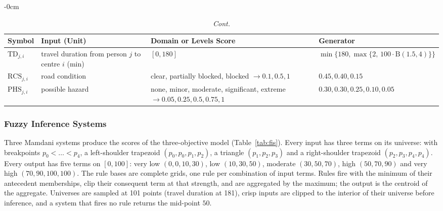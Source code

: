 \documentclass[systems,article,accept,moreauthors,pdftex]{Definitions/mdpi}
\begin{document}
\begin{table}[H]\ContinuedFloat
\small
\caption{{\em Cont.}}
\begin{adjustwidth}{-\extralength}{0cm}
\begin{minipage}{\fulllength}
\begin{tabularx}{\textwidth}{lLLL}
\toprule
\textbf{Symbol} & \textbf{Input (Unit)} & \textbf{Domain or Levels \boldmath{$\to$} Score} & \textbf{Generator}\\
\midrule

$\mathrm{TD}_{j,i}$ & travel duration from person $j$ to centre $i$ (min) & $[0,180]$ & $\min\{180,\max\{2,\,100\cdot\mathrm{B}(1.5,4)\}\}$\\
$\mathrm{RCS}_{j,i}$ & road condition & clear, partially blocked, \linebreak  blocked $\to 0.1, 0.5, 1$ & $0.45, 0.40, 0.15$\\
$\mathrm{PHS}_{j,i}$ & possible hazard & none, minor, moderate, significant, extreme $\to 0.05, 0.25, 0.5, 0.75, 1$ & $0.30, 0.30, 0.25, 0.10, 0.05$\\
\bottomrule
\end{tabularx}
\end{minipage}
\end{adjustwidth}
\end{table}

\subsubsection{Fuzzy Inference Systems}
Three Mamdani systems produce the scores of the three-objective model
(Table~\ref{tab:fis}). Every input has three terms on its universe: with breakpoints
$p_0<\ldots<p_4$, a left-shoulder trapezoid $(p_0,p_0,p_1,p_2)$, a triangle $(p_1,p_2,p_3)$ and a
right-shoulder trapezoid $(p_2,p_3,p_4,p_4)$. Every output has five terms on $[0,100]$: very low
$(0,0,10,30)$, low $(10,30,50)$, moderate $(30,50,70)$, high $(50,70,90)$ and very high
$(70,90,100,100)$. The rule bases are complete grids, one rule per combination of input terms.
Rules fire with the minimum of their antecedent memberships, clip their consequent term at
that strength, and are aggregated by the maximum; the output is the centroid of the
aggregate. Universes are sampled at 101 points (travel duration at 181), crisp inputs are
clipped to the interior of their universe before inference, and a system that fires no rule
returns the mid-point $50$.
\end{document}

